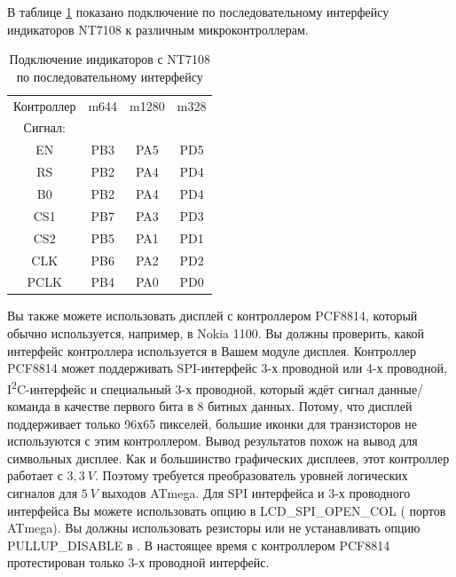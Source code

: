 В таблице \ref{tab:7108-processor} показано подключение по последовательному интерфейсу индикаторов 
NT7108 к различным микроконтроллерам.
\begin{table}[H]
  \begin{center}
    \begin{tabular}{| c || c | c | c |}
    \hline
Контроллер  & m644  &  m1280  & m328 \\
Сигнал:     &       &        &         \\
    \hline
    \hline
  EN        &  PB3  &  PA5   & PD5     \\
    \hline
  RS        &  PB2  &  PA4   & PD4      \\
  B0        &  PB2  &  PA4   & PD4      \\
    \hline
  CS1       &  PB7  &  PA3   & PD3      \\
    \hline
  CS2       &  PB5  &  PA1   & PD1      \\
    \hline
  CLK       &  PB6  &  PA2   & PD2      \\
    \hline
  PCLK      &  PB4  &  PA0   & PD0      \\
    \hline
    \end{tabular}
  \end{center}
  \caption{Подключение индикаторов с NT7108 по последовательному интерфейсу}
  \label{tab:7108-processor}
\end{table}

Вы также можете использовать дисплей с контроллером PCF8814, который обычно используется, 
например, в Nokia 1100. 
Вы должны проверить, какой интерфейс контроллера используется в Вашем модуле дисплея.
Контроллер PCF8814 может поддерживать SPI-интерфейс 3-х проводной или 4-х проводной, 
I\textsuperscript{2}C-интерфейс и специальный 3-х проводной, который ждёт сигнал 
данные/команда в качестве первого бита в 8 битных данных.
Потому, что дисплей поддерживает только 96х65 пикселей, большие иконки для транзисторов не используются 
с этим контроллером. Вывод результатов похож на вывод для символьных дисплее. 
Как и большинство графических дисплеев, этот контроллер работает с \(3,3~V\). 
Поэтому требуется преобразователь уровней логических сигналов для \(5~V\) выходов ATmega.
Для SPI интерфейса и 3-х проводного интерфейса Вы можете использовать опцию в 
LCD\_SPI\_OPEN\_COL ( портов ATmega).
Вы должны использовать  резисторы или не устанавливать 
опцию PULLUP\_DISABLE в .  
В настоящее время с контроллером PCF8814 протестирован только 3-х проводной интерфейс.

